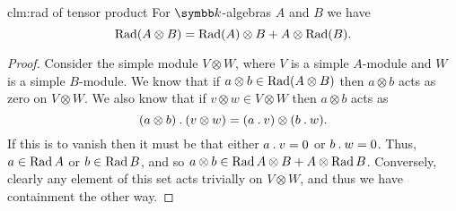 \begin{clm}{}{clm:rad of tensor product}
    For \(\field\)-algebras \(A\) and \(B\) we have
    \begin{equation}
        \operatorname{Rad}(A \otimes B) = \operatorname{Rad}(A) \otimes B + A \otimes \operatorname{Rad}(B).
    \end{equation}
    \begin{proof}
        Consider the simple module \(V \otimes W\), where \(V\) is a simple \(A\)-module and \(W\) is a simple \(B\)-module.
        We know that if \(a \otimes b \in \operatorname{Rad}(A \otimes B)\) then \(a \otimes b\) acts as zero on \(V \otimes W\).
        We also know that if \(v \otimes w \in V \otimes W\) then \(a \otimes b\) acts as
        \begin{equation}
            (a \otimes b) \mathbin{.} (v \otimes w) = (a \mathbin{.} v) \otimes (b \mathbin{.} w).
        \end{equation}
        If this is to vanish then it must be that either \(a \mathbin{.} v = 0\) or \(b \mathbin{.} w = 0\).
        Thus, \(a \in \operatorname{Rad} A\) or \(b \in \operatorname{Rad} B\), and so \(a \otimes b \in \operatorname{Rad} A \otimes B + A \otimes \operatorname{Rad} B\).
        Conversely, clearly any element of this set acts trivially on \(V \otimes W\), and thus we have containment the other way.
    \end{proof}
\end{clm}